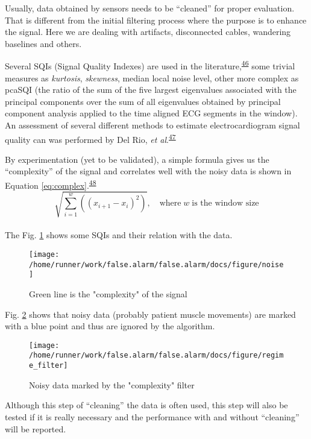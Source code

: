 \documentclass[12pt,twoside]{fmupthesis}
\begin{document}
Usually, data obtained by sensors needs to be ``cleaned'' for proper evaluation. That is different
from the initial filtering process where the purpose is to enhance the signal. Here we are dealing
with artifacts, disconnected cables, wandering baselines and others.

Several SQIs (Signal Quality Indexes) are used in the literature,\textsuperscript{\protect\hyperlink{ref-eerikainen2015}{46}} some trivial
measures as \emph{kurtosis}, \emph{skewness}, median local noise level, other more complex as pcaSQI (the
ratio of the sum of the five largest eigenvalues associated with the principal components over the
sum of all eigenvalues obtained by principal component analysis applied to the time aligned ECG
segments in the window). An assessment of several different methods to estimate electrocardiogram
signal quality can was performed by Del Rio, \emph{et al}.\textsuperscript{\protect\hyperlink{ref-DelRio2011}{47}}

By experimentation (yet to be validated), a simple formula gives us the
``complexity'' of the signal and correlates well with the noisy data is shown in Equation
\eqref{eq:complex}.\textsuperscript{\protect\hyperlink{ref-Batista2014}{48}}
\begin{equation}
\sqrt{\sum_{i=1}^w((x_{i+1}-x_i)^2)}, \quad \text{where}\; w \; \text{is the window size} \label{eq:complex}
\end{equation}\\
The Fig. \ref{fig:sqi} shows some SQIs and their relation with the data.
\begin{figure}

{\centering \texttt{[image: /home/runner/work/false.alarm/false.alarm/docs/figure/noise]} 

}

\caption{Green line is the "complexity" of the signal}\label{fig:sqi}
\end{figure}
Fig. \ref{fig:datafilter} shows that noisy data (probably patient muscle movements) are marked
with a blue point and thus are ignored by the algorithm.
\begin{figure}

{\centering \texttt{[image: /home/runner/work/false.alarm/false.alarm/docs/figure/regime\_filter]} 

}

\caption{Noisy data marked by the "complexity" filter}\label{fig:datafilter}
\end{figure}
Although this step of ``cleaning'' the data is often used, this step will also be tested if it is
really necessary and the performance with and without ``cleaning'' will be reported.
\end{document}
